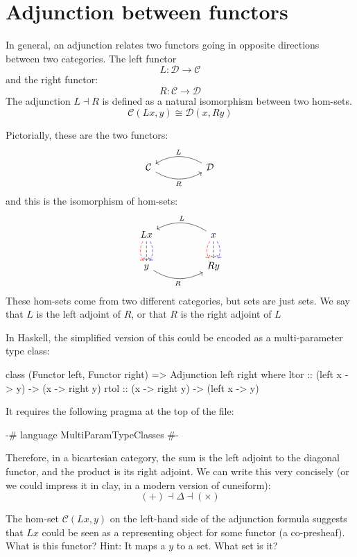 \documentclass[DaoFP]{subfiles}
\begin{document}
\section{Adjunction between functors}

In general, an adjunction relates two functors going in opposite directions between two categories. The left functor 
\[ L \colon \mathcal{D} \to \mathcal{C}\]
and the right functor:
\[ R \colon \mathcal{C} \to  \mathcal{D} \]
The adjunction $L \dashv R$ is defined as a natural isomorphism between two hom-sets.
\[  \mathcal{C} (L x, y) \cong \mathcal{D}( x , R y)\]

Pictorially, these are the two functors:
\[
 \begin{tikzcd}
  \mathcal{C}
  \arrow[rr, bend right, "R"']
  &&
  \mathcal{D}
  \arrow[ll, bend right, "L"']
  \end{tikzcd}
\]
and this is the isomorphism of hom-sets:
\[
 \begin{tikzcd}
L x
\arrow[d, bend right, red, dashed]
\arrow[d, dashed]
\arrow[d, bend left, blue, dashed]
  &&
  x
\arrow[d, bend right, red, dashed]
\arrow[d, dashed]
\arrow[d, bend left, blue, dashed]
 \arrow[ll, bend right, "L"']
 \\
y
   \arrow[rr, bend right, "R"']
 &&
 R y
  \end{tikzcd}
\]
 These hom-sets come from two different categories, but sets are just sets. We say that $L$ is the left adjoint of $R$, or that $R$ is the right adjoint of $L$

In Haskell, the simplified version of this could be encoded as a multi-parameter type class:
\begin{haskell}
class (Functor left, Functor right) => Adjunction left right where
  ltor :: (left x -> y) -> (x -> right y)
  rtol :: (x -> right y) -> (left x -> y)
\end{haskell}
It requires the following pragma at the top of the file:
\begin{haskell}
{-# language MultiParamTypeClasses #-}
\end{haskell}



Therefore, in a bicartesian category, the sum is the left adjoint to the diagonal functor, and the product is its right adjoint. We can write this very concisely (or we could impress it in clay, in a modern version of cuneiform):
\[ (+) \dashv \Delta \dashv (\times) \]

\begin{exercise}
The hom-set $\mathcal{C} (L x, y)$ on the left-hand side of the adjunction formula suggests that $L x$ could be seen as a representing object for some functor (a co-presheaf). What is this functor? Hint: It maps a $y$ to a set. What set is it?
\end{exercise}
\end{document}
